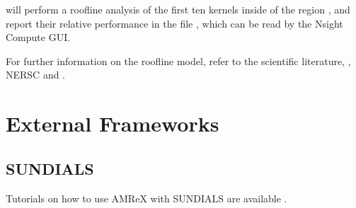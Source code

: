 \documentclass[letterpaper,10pt,english]{sphinxmanual}
\begin{document}
\begin{sphinxVerbatim}[commandchars=\\\{\}]
\end{sphinxVerbatim}

\sphinxAtStartPar
will perform a roofline analysis of the first ten kernels inside of the region , and report
their relative performance in the file , which can be read by the Nsight Compute GUI.

\sphinxAtStartPar
For further information on the roofline model, refer to the scientific literature, , NERSC
 and
.


\chapter{External Frameworks}
\label{\detokenize{External_Frameworks_Chapter:external-frameworks}}\label{\detokenize{External_Frameworks_Chapter:chap-external-frameworks}}\label{\detokenize{External_Frameworks_Chapter::doc}}

\section{SUNDIALS}
\label{\detokenize{SUNDIALS_top:sundials}}\label{\detokenize{SUNDIALS_top:chap-sundials}}\label{\detokenize{SUNDIALS_top::doc}}
\sphinxAtStartPar
Tutorials on how to use AMReX with SUNDIALS are available
.
\end{document}
